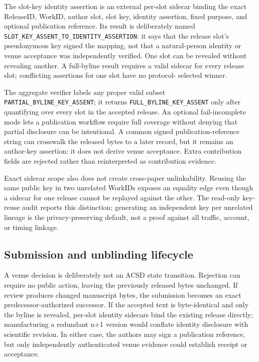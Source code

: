 \documentclass[11pt]{article}
\newcommand{\releaseid}{\textsf{ReleaseID}}
\begin{document}
The slot-key identity assertion is an external per-slot sidecar binding the exact
\releaseid, WorkID, author slot, slot key, identity assertion, fixed purpose,
and optional publication reference. Its result is deliberately named
\texttt{SLOT\_KEY\_ASSENT\_TO\_IDENTITY\_ASSERTION}: it says that the release
slot's pseudonymous key signed the mapping, not that a natural-person identity
or venue acceptance was independently verified. One slot can be revealed
without revealing another. A full-byline result requires a valid sidecar for
every release slot; conflicting assertions for one slot have no protocol-
selected winner.

The aggregate verifier labels any proper valid subset
\texttt{PARTIAL\_BYLINE\_KEY\_ASSENT}; it returns
\texttt{FULL\_BYLINE\_KEY\_ASSENT} only after quantifying over every slot in
the accepted release. An optional fail-incomplete mode lets a publication
workflow require full coverage without denying that partial disclosure can be
intentional. A common signed publication-reference string can crosswalk the
released bytes to a later record, but it remains an author-key assertion: it
does not derive venue acceptance. Extra contribution fields are rejected
rather than reinterpreted as contribution evidence.

Exact sidecar scope also does not create cross-paper unlinkability. Reusing the
same public key in two unrelated WorkIDs exposes an equality edge even though a
sidecar for one release cannot be replayed against the other. The read-only
key-reuse audit reports this distinction; generating an independent key per
unrelated lineage is the privacy-preserving default, not a proof against all
traffic, account, or timing linkage.

\subsection{Submission and unblinding lifecycle}

A venue decision is deliberately not an ACSD state transition. Rejection can
require no public action, leaving the previously released bytes unchanged. If
review produces changed manuscript bytes, the submission becomes an exact
predecessor-authorized successor. If the accepted text is byte-identical and
only the byline is revealed, per-slot identity sidecars bind the existing
release directly; manufacturing a redundant n+1 version would conflate
identity disclosure with scientific revision. In either case, the authors may
sign a publication reference, but only independently authenticated venue
evidence could establish receipt or acceptance.
\end{document}
